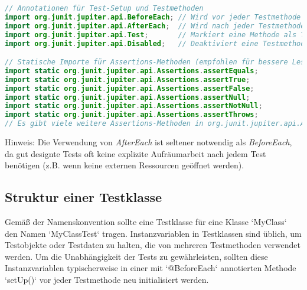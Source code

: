 \begin{lstlisting}[language=Java, caption={Grundlegende JUnit 5 Importe}]
// Annotationen für Test-Setup und Testmethoden
import org.junit.jupiter.api.BeforeEach; // Wird vor jeder Testmethode ausgeführt
import org.junit.jupiter.api.AfterEach;  // Wird nach jeder Testmethode ausgeführt (seltener benötigt)
import org.junit.jupiter.api.Test;       // Markiert eine Methode als Testmethode
import org.junit.jupiter.api.Disabled;   // Deaktiviert eine Testmethode oder -klasse

// Statische Importe für Assertions-Methoden (empfohlen für bessere Lesbarkeit)
import static org.junit.jupiter.api.Assertions.assertEquals;
import static org.junit.jupiter.api.Assertions.assertTrue;
import static org.junit.jupiter.api.Assertions.assertFalse;
import static org.junit.jupiter.api.Assertions.assertNull;
import static org.junit.jupiter.api.Assertions.assertNotNull;
import static org.junit.jupiter.api.Assertions.assertThrows;
// Es gibt viele weitere Assertions-Methoden in org.junit.jupiter.api.Assertions
\end{lstlisting}
Hinweis: Die Verwendung von \textit{AfterEach} ist seltener notwendig als \textit{BeforeEach}, da gut designte Tests oft keine explizite Aufräumarbeit nach jedem Test benötigen (z.B. wenn keine externen Ressourcen geöffnet werden).

\subsection{Struktur einer Testklasse}
\label{ssec:junit_klassenkopf}
Gemäß der Namenskonvention sollte eine Testklasse für eine Klasse `MyClass` den Namen `MyClassTest` tragen. Instanzvariablen in Testklassen sind üblich, um Testobjekte oder Testdaten zu halten, die von mehreren Testmethoden verwendet werden. Um die Unabhängigkeit der Tests zu gewährleisten, sollten diese Instanzvariablen typischerweise in einer mit `@BeforeEach` annotierten Methode `setUp()` vor jeder Testmethode neu initialisiert werden.

